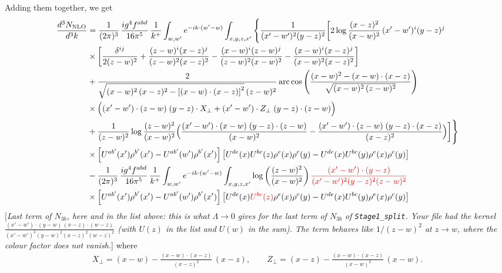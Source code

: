 \documentclass[9pt]{article}
\numberwithin{equation}{section}
\newcommand{\chg}[1]{{\color{red}#1}}
\newcommand{\rnote}[1]{{\color{teal}[\textit{#1}]}}
\begin{document}
Adding them together, we get
\begin{align}
\frac{d^{3}N_{\rm NLO}}{d^{3}k} &=\frac{1}{(2\pi)^{3}}\,\frac{ig^{4}f^{abd}}{16\pi^{5}}\,\frac{1}{k^{+}}\int_{w,w'}e^{-ik\cdot(w'-w)}\int_{x,y,z,x'}\Bigg\{\frac{1}{(x'-w')^{2}(y-z)^{2}}\bigg[2\log\frac{(x-z)^{2}}{(x-w)^{2}}\,(x'-w')^{i}(y-z)^{j}\notag \\
& \times\bigg[\frac{\delta^{ij}}{2(z-w)^{2}}+\frac{(z-w)^{i}(x-z)^{j}}{(z-w)^{2}(x-z)^{2}}-\frac{(x-w)^{i}(z-w)^{j}}{(z-w)^{2}(x-w)^{2}}-\frac{(x-w)^{i}(x-z)^{j}}{(x-w)^{2}(x-z)^{2}}\bigg]\notag \\
& +\frac{2}{\sqrt{(x-w)^{2}\,(x-z)^{2}-\left[(x-w)\cdot (x-z)\right]^{2}}\,(z-w)^{2}}\,\mathrm{arc\,cos}\left(\frac{(x-w)^{2}-(x-w)\cdot (x-z)}{\sqrt{(x-w)^{2}\,(z-w)^{2}}}\right)\notag \\
& \times\Big((x'-w')\cdot(z-w)\;(y-z)\cdot X_{\perp}+(x'-w')\cdot Z_{\perp}\;(y-z)\cdot(z-w)\Big)\notag\\
&+\frac{1}{(z-w)^{2}}\log\frac{(z-w)^{2}}{(x-w)^{2}}\Big(\frac{(x'-w')\cdot(x-w)\;(y-z)\cdot(z-w)}{(x-w)^{2}}-\frac{(x'-w')\cdot(z-w)\;(y-z)\cdot(x-z)}{(x-z)^{2}}\Big)\bigg]\Bigg\}\notag\\
&\times\left[U^{ab'}(x')\rho^{b'}(x')-U^{ab'}(w')\rho^{b'}(x')\right]\left[U^{de}(x)U^{bc}(z)\rho^{e}(x)\rho^{c}(y)-U^{de}(x)U^{bc}(y)\rho^{e}(x)\rho^{c}(y)\right]\notag\\
&-\frac{1}{(2\pi)^{3}}\,\frac{ig^{4}f^{abd}}{16\pi^{5}}\,\frac{1}{k^{+}}\int_{w,w'}e^{-ik\cdot(w'-w)}\int_{x,y,z,x'}\log\left(\frac{(z-w)^{2}}{(x-w)^{2}}\right)\chg{\frac{(x'-w')\cdot(y-z)}{(x'-w')^{2}(y-z)^{2}(z-w)^{2}}}\notag\\
&\times\left[U^{ab'}(x')\rho^{b'}(x')-U^{ab'}(w')\rho^{b'}(x')\right]\left[U^{de}(x)\chg{U^{bc}(z)}\rho^{e}(x)\rho^{c}(y)-U^{de}(x)U^{bc}(y)\rho^{e}(x)\rho^{c}(y)\right]
\end{align}
\rnote{Last term of $N_{3b}$, here and in the list above: this is what $\Lambda\to0$ gives for the last term of $N_{3b}$ of \texttt{Stage1\_split}. Your file had the kernel $\frac{(x'-w')\cdot(y-w)\,(x-z)\cdot(w-z)}{(x'-w')^{2}(y-w)^{2}(x-z)^{2}(w-z)^{2}}$ (with $U(z)$ in the list and $U(w)$ in the sum). The term behaves like $1/(z-w)^{2}$ at $z\to w$, where the colour factor does not vanish.}
where
\begin{align}
X_{\perp}=(x-w)-\frac{(x-w)\cdot(x-z)}{(x-z)^{2}}\,(x-z),\qquad
Z_{\perp}=(x-z)-\frac{(x-w)\cdot(x-z)}{(x-w)^{2}}\,(x-w).
\end{align}
\end{document}
